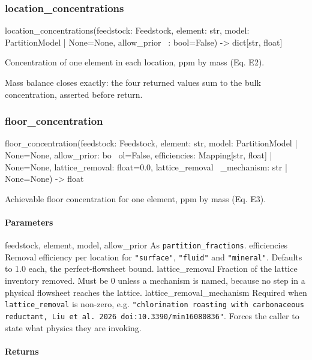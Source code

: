 \documentclass[10pt,a4paper,twoside]{report}
\begin{document}
\subsubsection*{location\_concentrations}

\begin{verbatimsmall}
location_concentrations(feedstock: Feedstock, element: str, model: PartitionModel | None=None, allow_prior
    \ : bool=False) -> dict[str, float]
\end{verbatimsmall}

Concentration of one element in each location, ppm by mass (Eq. E2).

Mass balance closes exactly: the four returned values sum to the bulk concentration, asserted before return.

\subsubsection*{floor\_concentration}

\begin{verbatimsmall}
floor_concentration(feedstock: Feedstock, element: str, model: PartitionModel | None=None, allow_prior: bo
    \ ol=False, efficiencies: Mapping[str, float] | None=None, lattice_removal: float=0.0, lattice_removal
    \ _mechanism: str | None=None) -> float
\end{verbatimsmall}

Achievable floor concentration for one element, ppm by mass (Eq. E3).

\paragraph*{Parameters}

feedstock, element, model, allow\_prior As \texttt{partition\_fractions}. efficiencies Removal efficiency per location for \texttt{"surface"}, \texttt{"fluid"} and \texttt{"mineral"}. Defaults to 1.0 each, the perfect-flowsheet bound. lattice\_removal Fraction of the lattice inventory removed. Must be 0 unless a mechanism is named, because no step in a physical flowsheet reaches the lattice. lattice\_removal\_mechanism Required when \texttt{lattice\_removal} is non-zero, e.g. \texttt{"chlorination roasting with carbonaceous reductant, Liu et al. 2026 doi:10.3390/min16080836"}. Forces the caller to state what physics they are invoking.

\paragraph*{Returns}
\end{document}
